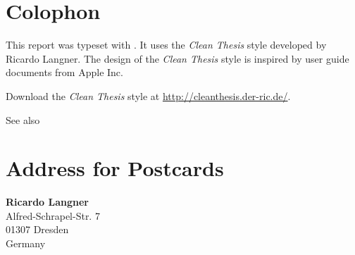 %
\pagestyle{empty}
\hfill
\vfill
{}
\section*{Colophon}

This report was typeset with \LaTeXe.
It uses the \textit{Clean Thesis} style developed by Ricardo Langner.
The design of the \textit{Clean Thesis} style is inspired by user guide documents from Apple Inc.

Download the \textit{Clean Thesis} style at \url{http://cleanthesis.der-ric.de/}.

See also \cite{WEB:Miede:2011}

\section*{Address for Postcards}
\label{sec:colophon:address}

\textbf{Ricardo Langner} \\
Alfred-Schrapel-Str. 7 \\
01307 Dresden \\
Germany

